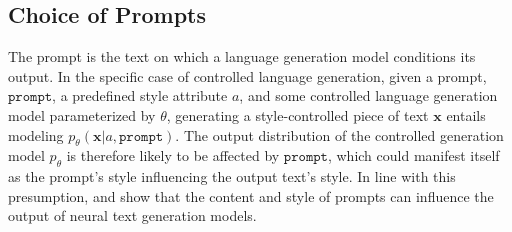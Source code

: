 

\subsection{Choice of Prompts}




The prompt is the text on which a language generation model conditions its output. In the specific case of controlled language generation, given a prompt, $\texttt{prompt}$, a predefined style attribute $a$, and some controlled language generation model parameterized by $\theta$, generating a style-controlled piece of text $\textbf{x}$ entails modeling $p_{\theta}(\textbf{x} | a, \texttt{prompt})$. The output distribution of the controlled generation model $p_{\theta}$ is therefore likely to be affected by $\texttt{prompt}$, which could manifest itself as the prompt's style influencing the output text's style. In line with this presumption, \cite{fan-etal-2018-hierarchical} and \cite{lester2021power} show that the content and style of prompts can influence the output of neural text generation models. 

